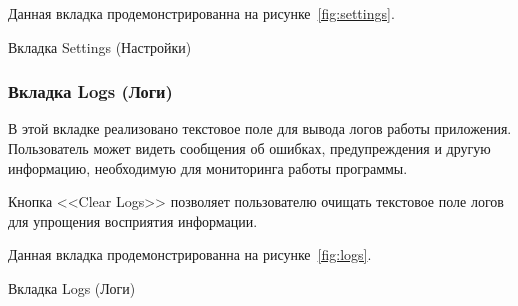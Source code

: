 Данная вкладка продемонстрированна на рисунке~\ref{fig:settings}.

\begin{image}
	\caption{Вкладка Settings (Настройки)}
	\label{fig:settings}
\end{image}

\subsubsection{Вкладка Logs (Логи)}

В этой вкладке реализовано текстовое поле для вывода логов работы приложения.
Пользователь может видеть сообщения об ошибках,
предупреждения и другую информацию,
необходимую для мониторинга работы программы.

Кнопка <<Clear Logs>> позволяет пользователю очищать текстовое
поле логов для упрощения восприятия информации.

Данная вкладка продемонстрированна на рисунке~\ref{fig:logs}.

\begin{image}
	\caption{Вкладка Logs (Логи)}
	\label{fig:logs}
\end{image}

